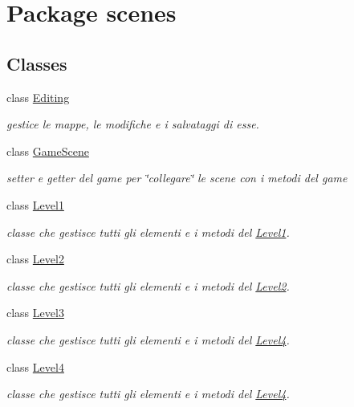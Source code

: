 \hypertarget{namespacescenes}{}\section{Package scenes}
\label{namespacescenes}
\subsection*{Classes}
\begin{DoxyCompactItemize}
\item 
class \hyperlink{classscenes_1_1_editing}{Editing}
\begin{DoxyCompactList}\small\item\em gestice le mappe, le modifiche e i salvataggi di esse. \end{DoxyCompactList}\item 
class \hyperlink{classscenes_1_1_game_scene}{Game\+Scene}
\begin{DoxyCompactList}\small\item\em setter e getter del game per \char`\"{}collegare\char`\"{} le scene con i metodi del game \end{DoxyCompactList}\item 
class \hyperlink{classscenes_1_1_level1}{Level1}
\begin{DoxyCompactList}\small\item\em classe che gestisce tutti gli elementi e i metodi del \hyperlink{classscenes_1_1_level1}{Level1}. \end{DoxyCompactList}\item 
class \hyperlink{classscenes_1_1_level2}{Level2}
\begin{DoxyCompactList}\small\item\em classe che gestisce tutti gli elementi e i metodi del \hyperlink{classscenes_1_1_level2}{Level2}. \end{DoxyCompactList}\item 
class \hyperlink{classscenes_1_1_level3}{Level3}
\begin{DoxyCompactList}\small\item\em classe che gestisce tutti gli elementi e i metodi del \hyperlink{classscenes_1_1_level4}{Level4}. \end{DoxyCompactList}\item 
class \hyperlink{classscenes_1_1_level4}{Level4}
\begin{DoxyCompactList}\small\item\em classe che gestisce tutti gli elementi e i metodi del \hyperlink{classscenes_1_1_level4}{Level4}. \end{DoxyCompactList}\item 

\end{DoxyCompactItemize}
